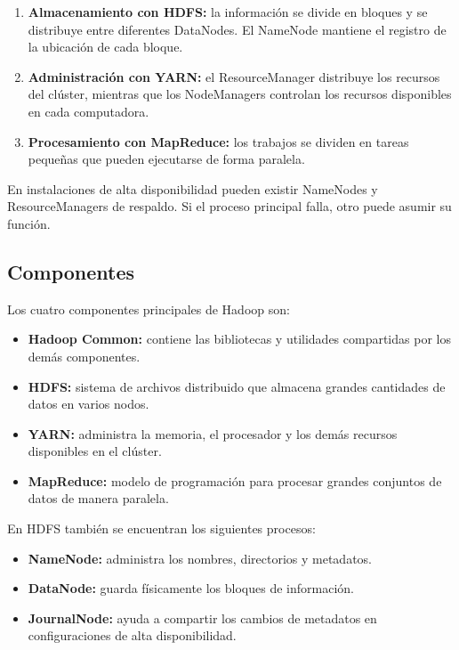 \begin{enumerate}
    \item \textbf{Almacenamiento con HDFS:} la información se divide en bloques
    y se distribuye entre diferentes DataNodes. El NameNode mantiene el registro
    de la ubicación de cada bloque.
    
    \item \textbf{Administración con YARN:} el ResourceManager distribuye los
    recursos del clúster, mientras que los NodeManagers controlan los recursos
    disponibles en cada computadora.
    
    \item \textbf{Procesamiento con MapReduce:} los trabajos se dividen en
    tareas pequeñas que pueden ejecutarse de forma paralela.
\end{enumerate}

En instalaciones de alta disponibilidad pueden existir NameNodes y
ResourceManagers de respaldo. Si el proceso principal falla, otro puede asumir
su función.

\subsection{Componentes}

Los cuatro componentes principales de Hadoop son:

\begin{itemize}
    \item \textbf{Hadoop Common:} contiene las bibliotecas y utilidades
    compartidas por los demás componentes.
    
    \item \textbf{HDFS:} sistema de archivos distribuido que almacena grandes
    cantidades de datos en varios nodos.
    
    \item \textbf{YARN:} administra la memoria, el procesador y los demás
    recursos disponibles en el clúster.
    
    \item \textbf{MapReduce:} modelo de programación para procesar grandes
    conjuntos de datos de manera paralela.
\end{itemize}

En HDFS también se encuentran los siguientes procesos:

\begin{itemize}
    \item \textbf{NameNode:} administra los nombres, directorios y metadatos.
    \item \textbf{DataNode:} guarda físicamente los bloques de información.
    \item \textbf{JournalNode:} ayuda a compartir los cambios de metadatos en
    configuraciones de alta disponibilidad.
\end{itemize}

